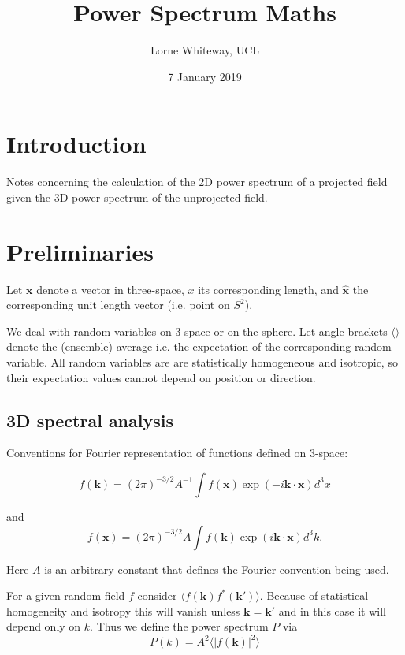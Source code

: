 \documentclass[11pt]{article}
\title{Power Spectrum Maths}
\author{Lorne Whiteway, UCL}
\date{7 January 2019}
\begin{document}
\maketitle

\section {Introduction}

Notes concerning the calculation of the 2D power spectrum of a projected field given the 3D power spectrum of the unprojected field.

\section {Preliminaries}

Let $\boldsymbol{x}$ denote a vector in three-space, $x$ its corresponding length, and $\boldsymbol{\hat{x}}$ the corresponding unit length vector (i.e. point on $S^2$).

We deal with random variables on 3-space or on the sphere. Let angle brackets $\langle \rangle $ denote the (ensemble) average i.e. the expectation of the corresponding random variable. All random variables are are statistically homogeneous and isotropic, so their expectation values cannot depend on position or direction.

\subsection{3D spectral analysis}

Conventions for Fourier representation of functions defined on 3-space:

\begin{equation}
f(\boldsymbol{k}) = (2\pi)^{-3/2} A^{-1} \int f(\boldsymbol{x}) \exp(-i \boldsymbol{k} \cdot \boldsymbol{x}) d^3x
\end{equation}

\noindent and
\begin{equation}
f(\boldsymbol{x}) = (2\pi)^{-3/2} A \int f(\boldsymbol{k}) \exp(i \boldsymbol{k} \cdot \boldsymbol{x}) d^3k.
\end{equation}

\noindent Here $A$ is an arbitrary constant that defines the Fourier convention being used.

For a given random field $f$ consider $\langle f(\boldsymbol{k})f^{\ast}(\boldsymbol{k}')\rangle$. Because of statistical homogeneity and isotropy this will vanish unless $\boldsymbol{k} = \boldsymbol{k}'$ and in this case it will depend only on $k$. Thus we define the power spectrum $P$ via
\begin{equation}
P(k) = A^{2} \langle | f(\boldsymbol{k}) | ^2 \rangle
\end{equation}
\end{document}
